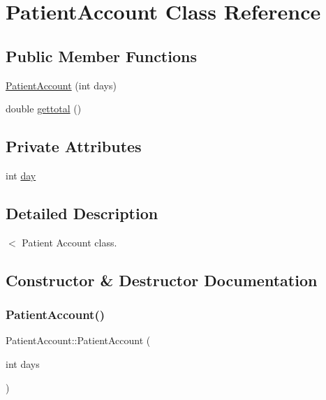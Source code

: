 \hypertarget{class_patient_account}{}\section{Patient\+Account Class Reference}
\label{class_patient_account}
\subsection*{Public Member Functions}
\begin{DoxyCompactItemize}
\item 
\mbox{\hyperlink{class_patient_account_af4257b1699a5a055a7fad74c080839bd}{Patient\+Account}} (int days)
\item 
double \mbox{\hyperlink{class_patient_account_a9161b18171c0a9e020485cd6930cb100}{gettotal}} ()
\end{DoxyCompactItemize}
\subsection*{Private Attributes}
\begin{DoxyCompactItemize}
\item 
int \mbox{\hyperlink{class_patient_account_a32470f327c1cf9fc4d68f32769a489b9}{day}}
\end{DoxyCompactItemize}


\subsection{Detailed Description}
$<$ Patient Account class. 

\subsection{Constructor \& Destructor Documentation}
\mbox{\label{class_patient_account_af4257b1699a5a055a7fad74c080839bd}} 
\subsubsection{\texorpdfstring{PatientAccount()}{PatientAccount()}}
{\footnotesize\ttfamily Patient\+Account\+::\+Patient\+Account (\begin{DoxyParamCaption}\item[{int}]{days }\end{DoxyParamCaption})\hspace{0.3cm}{\ttfamily [inline]}}


